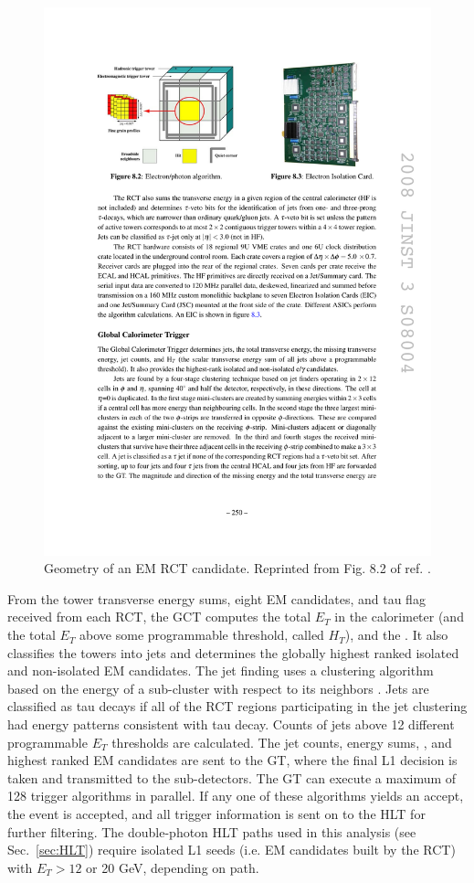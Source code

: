 \documentclass[dissertation.tex]{subfiles}
\begin{document}
\begin{figure}
	\centering
	\includegraphics[scale=1.0]{RCT_EG_candidate}
	\caption{Geometry of an EM RCT candidate.  Reprinted from Fig. 8.2 of ref. \cite{CMS_detector_paper}.}
	\label{fig:RCT_EG_candidate}
\end{figure}

From the tower transverse energy sums, eight EM candidates, and tau flag received from each RCT, the GCT computes the total $E_{T}$ in the calorimeter (and the total $E_{T}$ above some programmable threshold, called $H_{T}$), and the \MET.  It also classifies the towers into jets and determines the globally highest ranked isolated and non-isolated EM candidates.  The jet finding uses a clustering algorithm based on the energy of a sub-cluster with respect to its neighbors \cite{Smith}.  Jets are classified as tau decays if all of the RCT regions participating in the jet clustering had energy patterns consistent with tau decay.  Counts of jets above 12 different programmable $E_{T}$ thresholds are calculated.  The jet counts, energy sums, \MET, and highest ranked EM candidates are sent to the GT, where the final L1 decision is taken and transmitted to the sub-detectors.  The GT can execute a maximum of 128 trigger algorithms in parallel.  If any one of these algorithms yields an accept, the event is accepted, and all trigger information is sent on to the HLT for further filtering.  The double-photon HLT paths used in this analysis (see Sec.~\ref{sec:HLT}) require isolated L1 seeds (i.e. EM candidates built by the RCT) with $E_{T} > 12$ or 20 GeV, depending on path.
\end{document}
